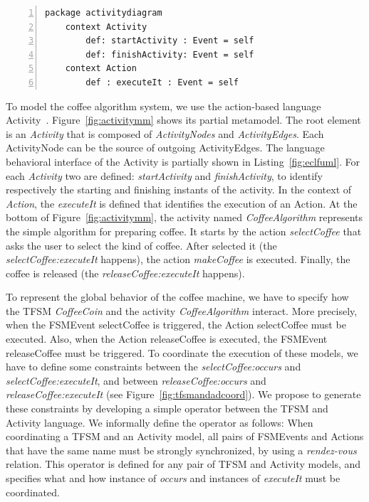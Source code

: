 	\begin{lstlisting}[language=ecl,
	caption={Partial \ecl specification of Activity Diagram},
	label={fig:eclfuml}, 
	basicstyle=\scriptsize\ttfamily, backgroundcolor=\color{LGrey}, numbers=left, xleftmargin=3pt, belowskip=-0.4em]
	package activitydiagram
	context Activity
		def: startActivity : Event = self
		def: finishActivity: Event = self
	context Action
		def : executeIt : Event = self
	\end{lstlisting}
To model the coffee algorithm system, we use the action-based language Activity~\cite{ttc15bib}. Figure~\ref{fig:activitymm} shows its partial metamodel. The root element is an \emph{Activity} that is composed of \emph{ActivityNodes} and \emph{ActivityEdges}. Each ActivityNode can be the source of outgoing ActivityEdges. The language behavioral interface of the Activity is partially shown in Listing~\ref{fig:eclfuml}. For each \emph{Activity} two \dse are defined: \emph{startActivity} and \emph{finishActivity}, to identify respectively the starting and finishing instants of the activity. In the context of \emph{Action}, the \dse \emph{executeIt} is defined that identifies the execution of an Action. At the bottom of Figure~\ref{fig:activitymm}, the activity named \emph{CoffeeAlgorithm} represents the simple algorithm for preparing coffee. It starts by the action \emph{selectCoffee} that asks the user to select the kind of coffee. After selected it (the \mse \emph{selectCoffee:executeIt} happens), the action \emph{makeCoffee} is executed. Finally, the coffee is released (the \mse \emph{releaseCoffee:executeIt} happens).

To represent the global behavior of the coffee machine, we have to specify how the TFSM \emph{CoffeeCoin} and the activity \emph{CoffeeAlgorithm} interact. More precisely, when the FSMEvent selectCoffee is triggered, the Action selectCoffee must be executed. Also, when the Action releaseCoffee is executed, the FSMEvent releaseCoffee must be triggered. To coordinate the execution of these models, we have to define some constraints between the \mse \emph{selectCoffee:occurs} and \emph{selectCoffee:executeIt}, and between \emph{releaseCoffee:occurs} and \emph{releaseCoffee:executeIt} (see Figure~\ref{fig:tfsmandadcoord}). We propose to generate these constraints by developing a simple \bcool operator between the TFSM and Activity language. We informally define the operator as follows: When coordinating a TFSM and an Activity model, all pairs of FSMEvents and Actions that have the same name must be strongly synchronized, \ie by using a \emph{rendez-vous} relation. This operator is defined for any pair of TFSM and Activity models, and specifies what and how instance of \dse \emph{occurs} and instances of \dse \emph{executeIt} must be coordinated. 

